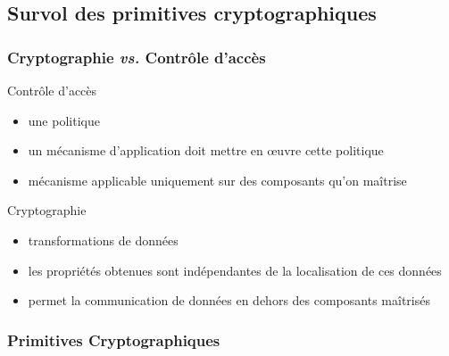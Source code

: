 


  
\usepackage{ifthen}


\def\txthl#1{ \ifthenelse{\lengthtest{#1 pt<0.5pt}}{\top}{\bot} }



\begin{reveals}
		
\maketitle


\section{Survol des primitives cryptographiques}


\begin{frame}
  \frametitle{Cryptographie \textit{vs.} Contrôle d'accès}

  \vfill

  \begin{block}{Contrôle d'accès}
    \begin{itemize}
    \item une politique
    \item un mécanisme d'application doit mettre en \oe uvre cette
      politique
    \item mécanisme applicable uniquement sur des composants qu'on
      maîtrise
    \end{itemize}
  \end{block}

  \vfill

  \begin{block}{Cryptographie}
    \begin{itemize}
    \item transformations de données
    \item les propriétés obtenues sont indépendantes
      de la localisation de ces données
    \item permet la communication de données en dehors des composants maîtrisés
    \end{itemize}
  \end{block}

  \vfill
\end{frame}




\begin{frame}
  \frametitle{Primitives Cryptographiques}


\end{frame}
\end{reveals}
